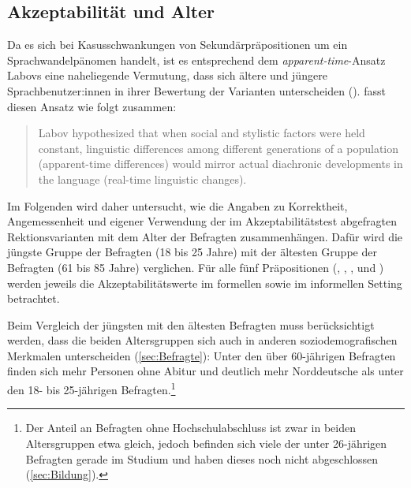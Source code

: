 \subsection{Akzeptabilität und Alter}
\label{sec:ErgAkzNachAlter}
\largerpage
Da es sich bei Kasusschwankungen von Sekundärpräpositionen um ein Sprachwandelpänomen handelt, ist es entsprechend dem \textit{apparent-time}-Ansatz Labovs eine naheliegende Vermutung, dass sich ältere und jüngere Sprachbenutzer:innen in ihrer Bewertung der Varianten unterscheiden (\citealp[s.][40]{Preston.1991}). 
\citet[313]{Bailey.2004} fasst diesen Ansatz wie folgt zusammen:
\begin{quote}Labov hypothesized that when social and stylistic factors were held constant, linguistic differences among different generations of a population (apparent-time differences) would mirror actual diachronic developments in the language (real-time linguistic changes).\end{quote}
Im Folgenden wird daher untersucht, wie die Angaben zu Korrektheit, Angemessenheit und eigener Verwendung der im Akzeptabilitätstest abgefragten Rektionsvarianten mit dem Alter der Befragten zusammenhängen. 
Dafür wird die jüngste Gruppe der Befragten (18 bis 25 Jahre) mit der ältesten Gruppe der Befragten (61 bis 85 Jahre) verglichen. 
Für alle fünf Präpositionen (\wegen{}, \waehrend{}, \dank{}, \gegenueber{} und ) werden jeweils die Akzeptabilitätswerte im formellen sowie im informellen Setting betrachtet.

Beim Vergleich der jüngsten mit den ältesten Befragten muss berücksichtigt werden, dass die beiden Altersgruppen sich auch in anderen soziodemografischen Merkmalen unterscheiden (\autoref{sec:Befragte}):
Unter den über 60-jährigen Befragten finden sich mehr Personen ohne Abitur und deutlich mehr Norddeutsche als unter den 18- bis 25-jährigen Befragten.\footnote{Der Anteil an Befragten ohne Hochschulabschluss ist zwar in beiden Altersgruppen etwa gleich, jedoch befinden sich viele der unter 26-jährigen Befragten gerade im Studium und haben dieses noch nicht abgeschlossen (\autoref{sec:Bildung}).} 

